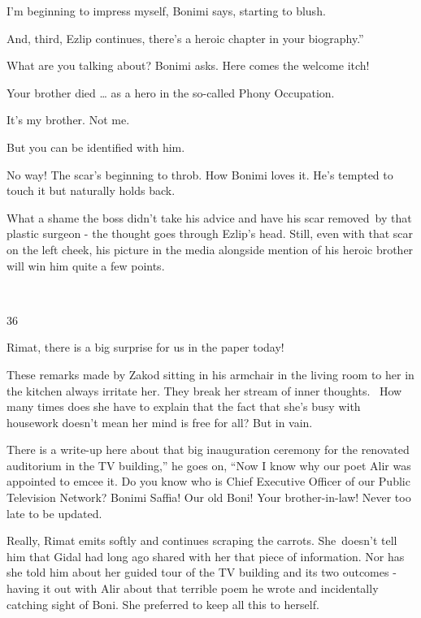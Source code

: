 \documentclass[12pt]{book}
\begin{document}
{\textquotedbl}I'm beginning to impress myself,{\textquotedbl} Bonimi says, {\textquotedbl}starting to
blush.{\textquotedbl}

{\textquotedbl}And, third,{\textquotedbl} Ezlip continues, {\textquotedbl}there's a heroic chapter in your biography.''

{\textquotedbl}What are you talking about?{\textquotedbl} Bonimi asks. Here comes the welcome itch!~

{\textquotedbl}Your brother died {\dots} as a hero in the so-called Phony Occupation.{\textquotedbl}

{\textquotedbl}It's my brother. Not me.{\textquotedbl}

{\textquotedbl}But you can be identified with him.{\textquotedbl}

{\textquotedbl}No way!{\textquotedbl} The scar's beginning to throb. How Bonimi loves it. He's tempted to touch it but
naturally holds back.

What a shame the boss didn't take his advice and have his scar removed~by that plastic surgeon - the thought goes
through Ezlip's head. Still, even with that scar on the left cheek, his picture in the media alongside mention of his
heroic brother will win him quite a few points.

~

36

{\textquotedbl}Rimat, there is a big surprise for us in the paper today!{\textquotedbl}

These remarks made by Zakod sitting in his armchair in the living room to her in the kitchen always irritate her. They
break her stream of inner thoughts. {\ }How many times does she have to
explain{ }that the fact that she's busy with housework doesn't mean her mind is
free for all? But in vain.

{\textquotedbl}There is a write-up here about that big inauguration ceremony for the renovated auditorium in the TV
building,'' he goes on, ``Now I know why our poet Alir was appointed to emcee it. Do you know who is Chief Executive
Officer of our Public Television Network? Bonimi Saffia! Our old Boni! Your brother-in-law! Never too late to be
updated.{\textquotedbl}

{\textquotedbl}Really,{\textquotedbl} Rimat emits softly and continues scraping the carrots. She~doesn't tell him that
Gidal had long ago shared with her that piece of information. Nor has she told him about her guided tour of the TV
building and its two outcomes - having it out with Alir about that terrible poem he wrote and incidentally catching
sight of Boni. She preferred to keep all this to herself. ~
\end{document}
